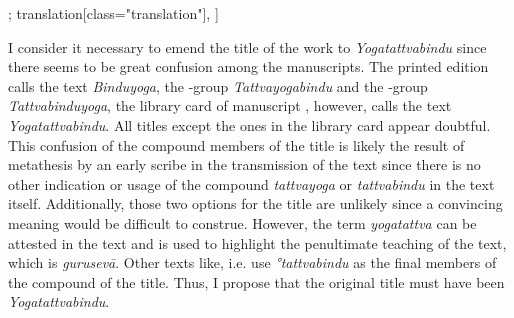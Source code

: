 \begin{alignment}[
  texts=edition[class="edition"];
  translation[class="translation"],
  ]
\begin{edition}
\begin{prose}[p58_05]
{I consider it necessary to emend the title of the work to \textit{Yogatattvabindu} since there seems to be great confusion among the manuscripts. The printed edition calls the text \textit{Binduyoga}, the \alpha-group \textit{Tattvayogabindu} and the \beta-group \textit{Tattvabinduyoga}, the library card of manuscript , however, calls the text \textit{Yogatattvabindu}. All titles except the ones in the library card appear doubtful. This confusion of the compound members of the title is likely the result of metathesis by an early scribe in the transmission of the text since there is no other indication or usage of the compound \textit{tattvayoga} or \textit{tattvabindu} in the text itself. Additionally, those two options for the title are unlikely since a convincing meaning would be difficult to construe. However, the term \textit{yogatattva} can be attested in the text and is used to highlight the penultimate teaching of the text, which is \textit{gurusevā}. Other texts like, i.e.  use \textit{°tattvabindu} as the final members of the compound of the title. Thus, I propose that the original title must have been \textit{Yogatattvabindu}.}
    \end{prose}
  \end{edition}
  \begin{translation}
    \begin{tlate}[p58_05]

\end{tlate}
\end{translation}
\end{alignment}
